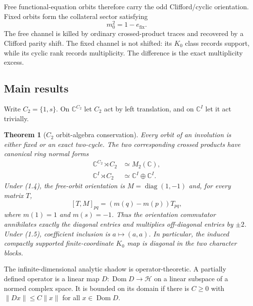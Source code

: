 \documentclass[11pt,reqno]{amsart}
\newtheorem{theorem}{Theorem}[section]
\newcommand{\C}{\mathbb C}
\newcommand{\Dom}{\operatorname{Dom}}
\newcommand{\cH}{\mathcal H}
\begin{document}
Free functional-equation orbits therefore carry the odd Clifford/cyclic orientation.  Fixed
orbits form the collateral sector satisfying
\[
                 m_0^2=1-e_{\mathrm{fix}}.           \tag{1.3}
\]
The free channel is killed by ordinary crossed-product traces and recovered by a Clifford parity
shift.  The fixed channel is not shifted: its $K_0$ class records support, while its cyclic rank
records multiplicity.  The difference is the exact multiplicity excess.

\subsection{Main results}

Write $C_2=\{1,s\}$.  On $\C^{C_2}$ let $C_2$ act by left translation, and on $\C^I$ let it act
trivially.

\begin{theorem}[$C_2$ orbit-algebra conservation]\label{thm:orbitlaw}
Every orbit of an involution is either fixed or an exact two-cycle.  The two corresponding crossed
products have canonical ring normal forms
\begin{align}
 \C^{C_2}\rtimes C_2&\simeq M_2(\C),                 \tag{1.4}\\
 \C^I\rtimes C_2&\simeq \C^I\oplus\C^I.             \tag{1.5}
\end{align}
Under \textup{(1.4)}, the free-orbit orientation is
$M=\operatorname{diag}(1,-1)$ and, for every matrix $T$,
\[
             [T,M]_{pq}=(m(q)-m(p))T_{pq},           \tag{1.6}
\]
where $m(1)=1$ and $m(s)=-1$.  Thus the orientation commutator annihilates exactly the diagonal
entries and multiplies off-diagonal entries by $\pm2$.  Under \textup{(1.5)}, coefficient
inclusion is $a\mapsto(a,a)$.  In particular, the induced compactly supported finite-coordinate
$K_0$ map is diagonal in the two character blocks.
\end{theorem}

The infinite-dimensional analytic shadow is operator-theoretic.  A partially defined operator is
a linear map
$D:\Dom D\to\cH$ on a linear subspace of a normed complex space.  It is bounded on its domain if
there is $C\ge0$ with $\|Dx\|\le C\|x\|$ for all $x\in\Dom D$.
\end{document}

